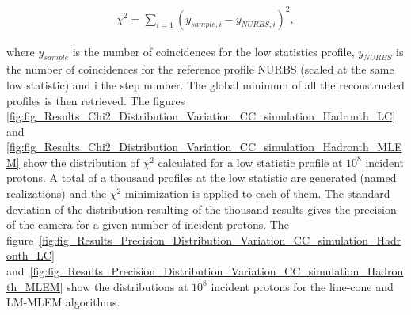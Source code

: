  \begin{eqnarray}
\chi^2 = \sum\limits_{i=1} {(y_{sample,i}-y_{NURBS,i})^2},
\end{eqnarray}

where $y_{sample}$ is the number of coincidences for the low statistics profile, $y_{NURBS}$ is the number of coincidences for the reference profile NURBS (scaled at the same low statistic) and i the step number.\newline
The global minimum of all the reconstructed profiles is then retrieved. The figures \ref{fig:fig_Results_Chi2_Distribution_Variation_CC_simulation_Hadronth_LC} and  \ref{fig:fig_Results_Chi2_Distribution_Variation_CC_simulation_Hadronth_MLEM} show the distribution of $\chi^2$ calculated for a low statistic profile at $10^8$ incident protons.\newline
A total of a thousand profiles at the low statistic are generated (named realizations) and the $\chi^2$ minimization is applied to each of them. The standard deviation of the distribution resulting of the thousand results gives the precision of the camera for a given number of incident protons. The figure~\ref{fig:fig_Results_Precision_Distribution_Variation_CC_simulation_Hadronth_LC} and~\ref{fig:fig_Results_Precision_Distribution_Variation_CC_simulation_Hadronth_MLEM} show the distributions at $10^8$ incident protons for the line-cone and LM-MLEM algorithms.


